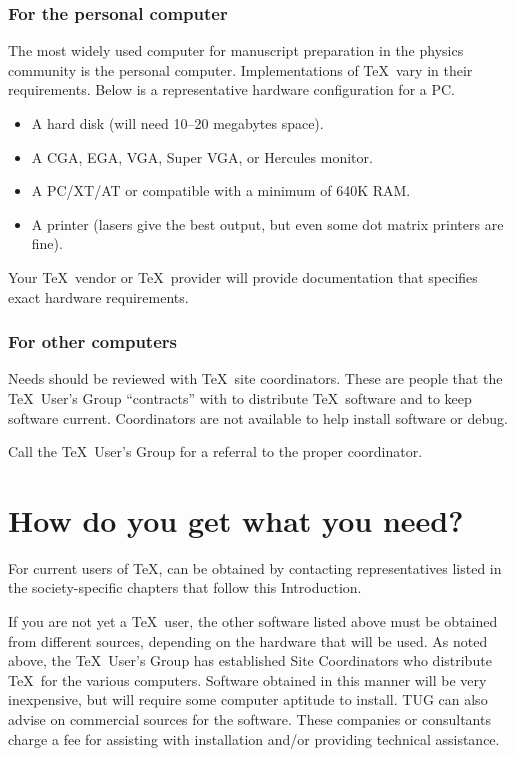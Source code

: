 \subsubsection{For the personal computer}

The most widely used computer for manuscript preparation in the physics
community is the personal computer. Implementations of \TeX\ vary in
their requirements.   Below is a representative hardware configuration
for a PC.

\begin{itemize}
\item A hard disk (will need 10--20 megabytes space).

\item A CGA, EGA, VGA, Super VGA, or Hercules monitor.

\item A PC/XT/AT or compatible with a minimum of 640K RAM.

\item A printer (lasers give the best output, but even some dot matrix
printers are fine).
\end{itemize}

Your \TeX\ vendor or \TeX\ provider will provide documentation
that specifies exact hardware requirements.

\subsubsection{For other computers}

Needs should be reviewed with \TeX\ site coordinators.  These
are people that the \TeX\ User's Group ``contracts'' with to distribute
\TeX\ software and to keep software current. Coordinators are not
available to help install software or debug.

Call the \TeX\ User's Group for a referral to the proper coordinator.


\section{How do you get what you need?}

For current users of \TeX , \REVTeX{} can be obtained by contacting
representatives listed in the society-specific chapters that
follow this Introduction.

If you are not yet a \TeX\ user, the other software listed above must be
obtained from different sources, depending on the hardware that will be
used. As noted above, the \TeX\ User's Group has established Site
Coordinators who distribute \TeX\ for the various computers.  Software
obtained in this manner will be very inexpensive, but will require some
computer aptitude to install.  TUG can also advise on commercial sources
for the software. These companies or consultants charge a fee for assisting
with installation and/or providing technical assistance.

